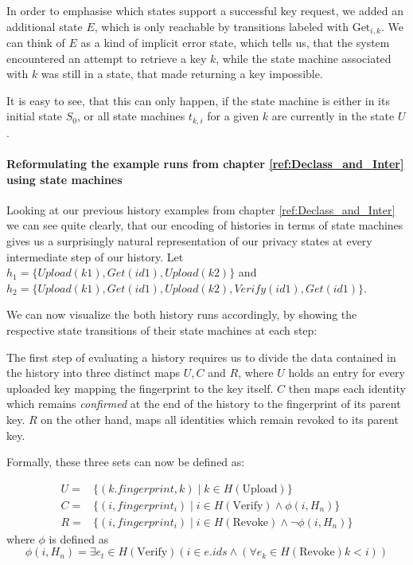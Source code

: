 In order to emphasise which states support a successful key request, we added an additional state \(E\), which is only reachable by transitions labeled with \(\text{Get}_{i,k}\). We can think of \(E\) as a kind of implicit error state, which tells us, that the system encountered an attempt to retrieve a key \(k\), while the state machine associated with \(k\) was still in a state, that made returning a key impossible. 

It is easy to see, that this can only happen, if the state machine is either in its initial state \(S_0\), or all state machines \(t_{k,i}\) for a given \(k\) are currently in the state \(U\).
\\
\paragraph{Reformulating the example runs from chapter \ref{ref:Declass_and_Inter} using state machines}
Looking at our previous history examples from chapter \ref{ref:Declass_and_Inter} we can see quite clearly, that our encoding of histories in terms of state machines gives us a surprisingly natural representation of our privacy states at every intermediate step of our history.
Let \(h_1=\{Upload(k1),Get(id1),Upload(k2)\}\) and \(h_2 = \{Upload(k1),Get(id1),Upload(k2),Verify(id1),Get(id1)\}\).

We can now visualize the both history runs accordingly, by showing the respective state transitions of their state machines at each step:

The first step of evaluating a history requires us to divide the data contained in the history into three distinct maps \(U,C\) and \(R\), where \(U\) holds an entry for every uploaded key mapping the fingerprint to the key itself. \(C\) then maps each identity which remains \emph{confirmed} at the end of the history to the fingerprint of its parent key. \(R\) on the other hand, maps all identities which remain revoked to its parent key.

Formally, these three sets can now be defined as: 

\begin{equation}
    \begin{aligned}
        U =& \{(k.fingerprint,k)  \mid k \in H(\text{Upload}) \} \\
        C =& \{(i, fingerprint_i) \mid i \in H(\text{Verify}) \wedge \phi(i, H_n) \} \\
        R =& \{(i, fingerprint_i) \mid i \in H(\text{Revoke}) \wedge \neg \phi(i,H_n)\}
    \end{aligned}
\end{equation}
   where \(\phi\) is defined as 
\begin{equation}
    \phi(i,H_n) = \exists e_t\in H(\text{Verify}) ( i \in e.ids \wedge (\forall e_k \in H(\text{Revoke}) k < i  ))
\end{equation}
 
